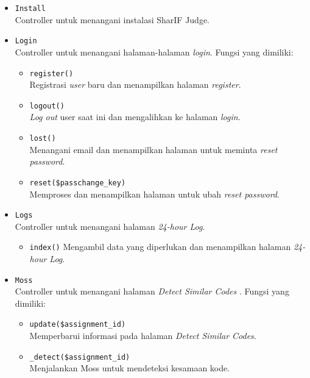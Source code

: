 \begin{itemize}
	\item \verb|Install| \\ Controller untuk menangani instalasi SharIF Judge.
	
	\item \verb|Login| \\ Controller untuk menangani halaman-halaman \textit{login}. Fungsi yang dimiliki:
	\begin{itemize}
		\item \verb|register()| \\ Registrasi \textit{user} baru dan menampilkan halaman \textit{register}.
		\item \verb|logout()| \\ \textit{Log out} user saat ini dan mengalihkan ke halaman \textit{login}.
		\item \verb|lost()| \\ Menangani email dan menampilkan halaman untuk meminta \textit{reset password}.
		\item \verb|reset($passchange_key)| \\ Memproses dan menampilkan halaman untuk ubah \textit{reset password}.
	\end{itemize}
	
	\item \verb|Logs| \\ Controller untuk menangani halaman \textit{24-hour Log}.
	\begin{itemize}
        \item \verb|index()| Mengambil data yang diperlukan dan menampilkan halaman \textit{24-hour Log}.
	\end{itemize}
	
	\item \verb|Moss| \\ Controller untuk menangani halaman \textit{Detect Similar Codes} . Fungsi yang dimiliki:
	\begin{itemize}
		\item \verb|update($assignment_id)| \\ Memperbarui informasi pada halaman \textit{Detect Similar Codes}.
		\item \verb|_detect($assignment_id)| \\ Menjalankan Moss untuk mendeteksi kesamaan kode.
	\end{itemize}
	

\end{itemize}

